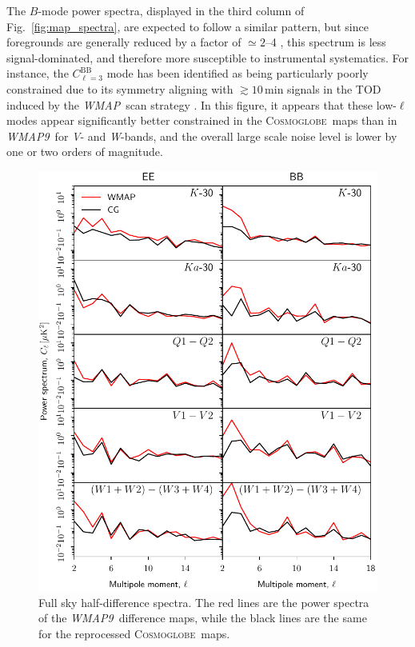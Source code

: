 \documentclass[twocolumn]{../../common/aa}
\def\WMAP{\emph{WMAP}}
\def\WMAPnine{\emph{WMAP9}}
\newcommand{\cosmoglobe}{\textsc{Cosmoglobe}}
\newcommand{\V}[0]{\textit V}
\newcommand{\W}[0]{\textit W}
\begin{document}
The $B$-mode power spectra, displayed in the third column of Fig.~\ref{fig:map_spectra}, are expected to follow a similar pattern, but since foregrounds are generally reduced by a factor of $\simeq2$--4 \citep{bennett2012,planck2016-l04}, this spectrum is less signal-dominated, and therefore more susceptible to instrumental systematics. For instance, the $C_{\ell=3}^\mathrm{BB}$ mode has been identified as being particularly poorly constrained due to its symmetry aligning with $\gtrsim10\,\mathrm{min}$ signals in the TOD induced by the \WMAP\ scan strategy \citep[e.g.,][]{jarosik2010}. In this figure, it appears that these low-$\ell$ modes appear significantly better constrained in the \cosmoglobe\ maps than in \WMAPnine\ for \V- and \W-bands, and the overall large scale noise level is lower by one or two orders of magnitude. 

\begin{figure}
	\centering
	\includegraphics[width=\linewidth]{figures/cls_cg_WMAP_lowl.pdf}
	\caption{Full sky half-difference spectra. The red lines are the power spectra of the \WMAPnine\ difference maps, while the black lines are the same for the reprocessed \cosmoglobe\ maps.}
        \label{fig:cl_halfdiff}
\end{figure}
\end{document}
